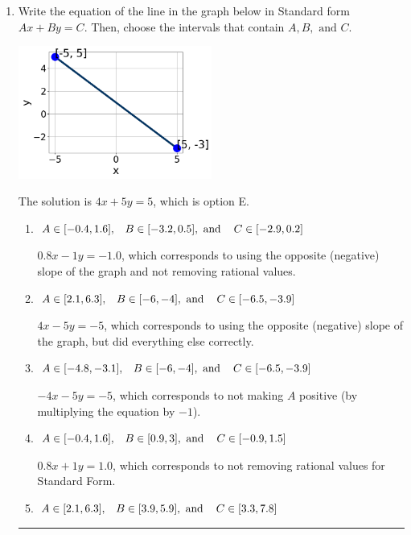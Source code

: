 \documentclass{extbook}[14pt]
\newcommand{\litem}[1]{\item #1

\rule{\textwidth}{0.4pt}}
\begin{document}
\begin{enumerate}\litem{
Write the equation of the line in the graph below in Standard form $Ax+By=C$. Then, choose the intervals that contain $A, B, \text{ and } C$.

\begin{center}
    \includegraphics[width=0.5\textwidth]{../Figures/linearGraphToStandardCopyC.png}
\end{center}




The solution is \( 4x + 5y = 5 \), which is option E.\begin{enumerate}[label=\Alph*.]
\item \( A \in [-0.4, 1.6], \hspace{3mm} B \in [-3.2, 0.5], \text{ and } \hspace{3mm} C \in [-2.9, 0.2] \)

 $0.8x - 1y = -1.0$, which corresponds to using the opposite (negative) slope of the graph and not removing rational values.
\item \( A \in [2.1, 6.3], \hspace{3mm} B \in [-6, -4], \text{ and } \hspace{3mm} C \in [-6.5, -3.9] \)

 $4x - 5y = -5$, which corresponds to using the opposite (negative) slope of the graph, but did everything else correctly.
\item \( A \in [-4.8, -3.1], \hspace{3mm} B \in [-6, -4], \text{ and } \hspace{3mm} C \in [-6.5, -3.9] \)

 $-4x - 5y = -5$, which corresponds to not making $A$ positive (by multiplying the equation by $-1$).
\item \( A \in [-0.4, 1.6], \hspace{3mm} B \in [0.9, 3], \text{ and } \hspace{3mm} C \in [-0.9, 1.5] \)

 $0.8x + 1y = 1.0$, which corresponds to not removing rational values for Standard Form.
\item \( A \in [2.1, 6.3], \hspace{3mm} B \in [3.9, 5.9], \text{ and } \hspace{3mm} C \in [3.3, 7.8] \)


\end{enumerate}}
\end{enumerate}
\end{document}

